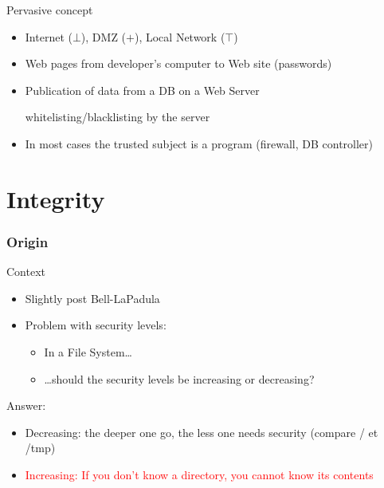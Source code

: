 \begin{reveals}
\begin{frame}
  \vfill

  \begin{block}{Pervasive concept}
    \begin{itemize}
    \item Internet (\(\bot\)), DMZ (\(+\)), Local Network (\(\top\))
    \item Web pages from developer's computer to Web site (passwords)
    \item Publication of data from a DB on a Web Server
      \begin{center}
        \color{red}whitelisting/blacklisting by the server
      \end{center}
    \item In most cases the trusted subject is a program (firewall, DB controller)
    \end{itemize}
  \end{block}
  
  \vfill
\end{frame}

\section{Integrity}


\begin{frame}
  \frametitle{Origin}

    \begin{block}{Context}
      \begin{itemize}
      \item Slightly post Bell-LaPadula
      \item Problem with security levels:
        \begin{itemize}
        \item In a File System\ldots
        \item \ldots should the security levels be increasing or decreasing?
        \end{itemize}
      \end{itemize}
    \end{block}


  \pause

  \begin{block}{Answer:}
    \begin{itemize}
    \item Decreasing: the deeper one go, the less one needs security  (compare / et /tmp)
    \item \textcolor{red}{Increasing: If you don't know a directory,
        you cannot know its contents }
    \end{itemize}
  \end{block}


\end{frame}
\end{reveals}
